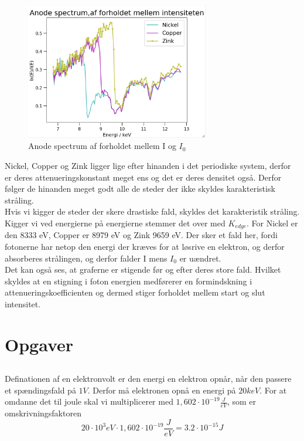 \documentclass[a4paper,twoside]{article}
\begin{document}
\begin{figure}[H]
\begin{centering}
\includegraphics[height=6cm]{Anode spectra forhold mellem intensiteterne.png}
\hspace{1cm}
\par\end{centering}
\caption{\label{cap:2ien} Anode spectrum af forholdet mellem I og $I_0$ }
\end{figure}
Nickel, Copper og Zink ligger lige efter hinanden i det periodiske system, derfor er deres attenueringskonstant meget ens og det er deres densitet også. Derfor følger de hinanden meget godt alle de steder der ikke skyldes karakteristisk stråling. 
\\ Hvis vi kigger de steder der skere drastiske fald, skyldes det karakteristik stråling. Kigger vi ved energierne på energierne stemmer det over med $K_{edge}$. For Nickel er den 8333 eV, Copper er 8979 eV og Zink 9659 eV. Der sker et fald her, fordi fotonerne har netop den energi der kræves for at løsrive en elektron, og derfor absorberes strålingen, og derfor falder I mens $I_0$ er uændret. 
\\
Det kan også ses, at graferne er stigende før og efter deres store fald. Hvilket skyldes at en stigning i foton energien medførerer en formindskning i attenueringskoefficienten og dermed stiger forholdet mellem start og slut intensitet. 


\section{Opgaver}
\subsection{}
Definationen af en elektronvolt er den energi en elektron opnår, når den passere et spændingsfald på $1V$. Derfor må elektronen opnå en energi på $20keV$. For at omdanne det til joule skal vi multiplicerer med $1,602\cdot10^{-19} \frac{J}{eV}$, som er omskrivningsfaktoren
\begin{equation*}
20\cdot10^3 eV \cdot1,602\cdot10^{-19} \frac{J}{eV}=3.2\cdot10^{-15} J
\end {equation*}
\end{document}
